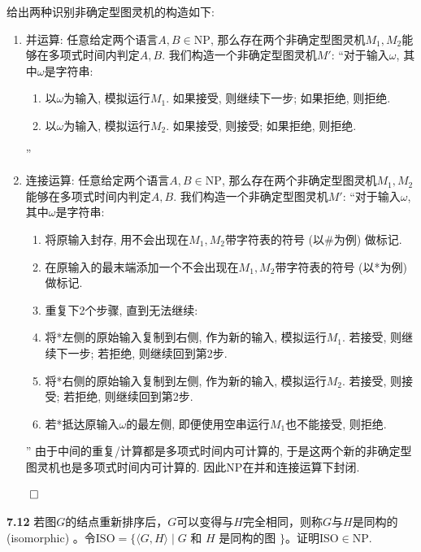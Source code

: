 \documentclass[UTF8]{report}
\newcommand{\problem}[1]{{\setlength{\parskip}{10pt}\noindent \bf{#1}}}
\renewenvironment{proof}{{\setlength{\parskip}{7pt}\noindent\hskip 2em \bf 证明 \quad}}{\hfill$\qed$\par}
\newcommand{\NP}{\mathrm{NP}}
\newcommand{\ISO}{\mathrm{ISO}}
\begin{document}
\begin{proof}
    给出两种识别非确定型图灵机的构造如下: 
    \begin{enumerate}[label=(\arabic*)]
        \item 并运算:
        任意给定两个语言$A, B \in \NP$, 那么存在两个非确定型图灵机$M_1, M_2$能够在多项式时间内判定$A, B$. 我们构造一个非确定型图灵机$M'$:
        ``对于输入$\omega$, 其中$\omega$是字符串:
        \begin{enumerate}
            \item 以$\omega$为输入, 模拟运行$M_1$. 如果接受, 则继续下一步; 如果拒绝, 则拒绝.
            \item 以$\omega$为输入, 模拟运行$M_2$. 如果接受, 则接受; 如果拒绝, 则拒绝.
        \end{enumerate}
        ''

        \item 连接运算:
        任意给定两个语言$A, B \in \NP$, 那么存在两个非确定型图灵机$M_1, M_2$能够在多项式时间内判定$A, B$. 我们构造一个非确定型图灵机$M'$:
        ``对于输入$\omega$, 其中$\omega$是字符串:
        \begin{enumerate}
            \item 将原输入封存, 用不会出现在$M_1, M_2$带字符表的符号 (以\#为例) 做标记.
            \item 在原输入的最末端添加一个不会出现在$M_1, M_2$带字符表的符号 (以*为例) 做标记.
            \item 重复下2个步骤, 直到无法继续:
            \item 将*左侧的原始输入复制到右侧, 作为新的输入, 模拟运行$M_1$. 若接受, 则继续下一步; 若拒绝, 则继续回到第2步.
            \item 将*右侧的原始输入复制到左侧, 作为新的输入, 模拟运行$M_2$. 若接受, 则接受; 若拒绝, 则继续回到第2步.
            \item 若*抵达原输入$\omega$的最左侧, 即便使用空串运行$M_1$也不能接受, 则拒绝.
        \end{enumerate}
        ''
        由于中间的重复/计算都是多项式时间内可计算的, 于是这两个新的非确定型图灵机也是多项式时间内可计算的. 因此$\NP$在并和连接运算下封闭.
    \end{enumerate}
\end{proof}


\problem{7.12} 若图$G$的结点重新排序后，$G$可以变得与$H$完全相同，则称$G$与$H $是同构的 (isomorphic) 。令$\ISO = \{ \langle G, H \rangle \mid G \text{ 和 } H \text{ 是同构的图 }\}$。证明$\ISO \in \NP$.
\end{document}
